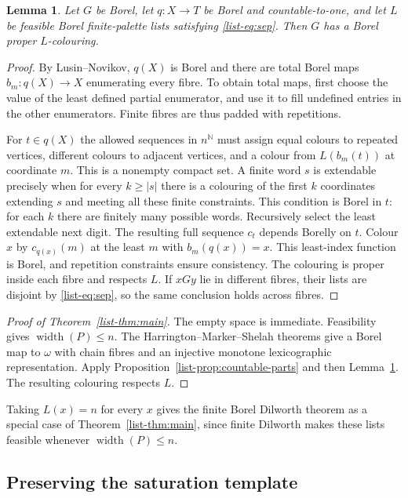 \documentclass[11pt,reqno]{amsart}
\theoremstyle{plain}
\newtheorem{lemma}[theorem]{Lemma}
\theoremstyle{definition}
\theoremstyle{remark}
\newcommand{\wdt}{\operatorname{width}}
\newcommand{\N}{\mathbb N}
\begin{document}
\begin{lemma}\label{list-lem:finish}
Let $G$ be Borel, let $q:X\to T$ be Borel and countable-to-one, and let
$L$ be feasible Borel finite-palette lists satisfying \eqref{list-eq:sep}.
Then $G$ has a Borel proper $L$-colouring.
\end{lemma}

\begin{proof}
By Lusin--Novikov, $q(X)$ is Borel and there are total Borel maps
$b_m:q(X)\to X$ enumerating every fibre. To obtain total maps, first
choose the value of the least defined partial enumerator, and use it to
fill undefined entries in the other enumerators. Finite fibres are thus
padded with repetitions.

For $t\in q(X)$ the allowed sequences in $n^\N$ must assign equal colours
to repeated vertices, different colours to adjacent vertices, and a colour
from $L(b_m(t))$ at coordinate $m$. This is a nonempty compact set.
A finite word $s$ is extendable precisely when for every $k\ge |s|$ there
is a colouring of the first $k$ coordinates extending $s$ and meeting all
these finite constraints. This condition is Borel in $t$: for each $k$
there are finitely many possible words. Recursively select the least
extendable next digit. The resulting full sequence $c_t$ depends Borelly
on $t$. Colour $x$ by $c_{q(x)}(m)$ at the least $m$ with $b_m(q(x))=x$.
This least-index function is Borel, and repetition constraints ensure
consistency. The colouring is proper inside each fibre and respects $L$.
If $xGy$ lie in different fibres, their lists are disjoint by
\eqref{list-eq:sep}, so the same conclusion holds across fibres.
\end{proof}

\begin{proof}[Proof of Theorem~\ref{list-thm:main}]
The empty space is immediate. Feasibility gives $\wdt(P)\le n$.
The Harrington--Marker--Shelah theorems give a Borel map to $\omega$
with chain fibres and an injective monotone lexicographic
representation. Apply Proposition~\ref{list-prop:countable-parts}
and then Lemma~\ref{list-lem:finish}. The resulting colouring
respects $L$.
\end{proof}

Taking $L(x)=n$ for every $x$ gives the finite Borel Dilworth
theorem as a special case of Theorem~\ref{list-thm:main}, since
finite Dilworth makes these lists feasible whenever
$\wdt(P)\le n$.

\subsection{Preserving the saturation template}
\label{sec:preserve-template}
\end{document}

